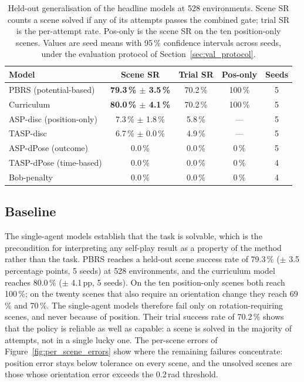 \begin{table}[H]
    \centering
    \small
    \begin{tabular}{l c c c c}
        \hline
        \textbf{Model} & \textbf{Scene SR} & \textbf{Trial SR} & \textbf{Pos-only} & \textbf{Seeds} \\
        \hline
        PBRS (potential-based)   & \textbf{79.3\,\% $\pm$ 3.5\,\%} & 70.2\,\% & 100\,\% & 5 \\
        Curriculum               & \textbf{80.0\,\% $\pm$ 4.1\,\%} & 70.2\,\% & 100\,\% & 5 \\
        ASP-disc (position-only) & 7.3\,\% $\pm$ 1.8\,\%  & 5.8\,\% & --- & 5 \\
        TASP-disc                & 6.7\,\% $\pm$ 0.0\,\%  & 4.9\,\% & --- & 5 \\
        ASP-dPose (outcome)      & 0.0\,\%                & 0.0\,\% & 0\,\%  & 5 \\
        TASP-dPose (time-based)  & 0.0\,\%                & 0.0\,\% & 0\,\%  & 4 \\
        Bob-penalty              & 0.0\,\%                & 0.0\,\% & 0\,\%  & 4 \\
        \hline
    \end{tabular}
    \caption{Held-out generalisation of the headline models at 528 environments.
    Scene SR counts a scene solved if any of its attempts passes the combined gate;
    trial SR is the per-attempt rate. Pos-only is the scene SR on the ten
    position-only scenes. Values are seed means with 95\,\% confidence intervals
    across seeds, under the evaluation protocol of Section~\ref{sec:val_protocol}.}
    \label{tab:main_results}
\end{table}

\subsection{Baseline}
\label{sec:rq_baseline}

The single-agent models establish that the task is solvable, which is the
precondition for interpreting any self-play result as a property of the method
rather than the task. PBRS reaches a held-out scene success rate of
79.3\,\% ($\pm$ 3.5 percentage points, 5 seeds) at 528 environments, and the
curriculum model reaches 80.0\,\% ($\pm$ 4.1\,pp, 5 seeds). On the ten
position-only scenes both reach 100\,\%; on the twenty scenes that also require
an orientation change they reach 69\,\% and 70\,\%. The single-agent models
therefore fail only on rotation-requiring scenes, and never because of position.
Their trial success rate of 70.2\,\% shows that the policy is reliable as well as
capable: a scene is solved in the majority of attempts, not in a single lucky one.
The per-scene errors of Figure~\ref{fig:per_scene_errors} show where the
remaining failures concentrate: position error stays below tolerance on every
scene, and the unsolved scenes are those whose orientation error exceeds
the 0.2\,rad threshold.

